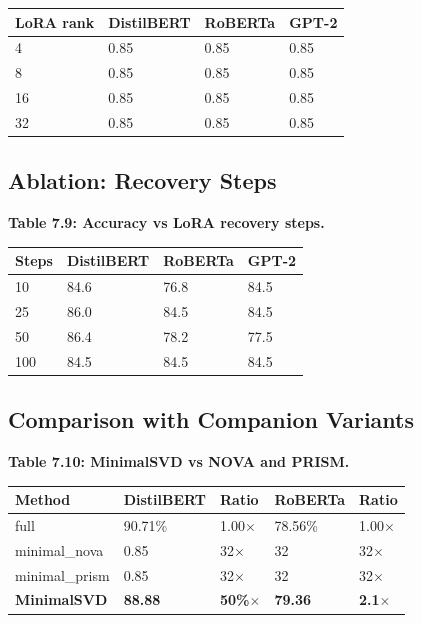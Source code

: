 \begin{table}[H]
\centering
\small
\begin{tabular}{llll}
\toprule
\textbf{LoRA rank} & \textbf{DistilBERT} & \textbf{RoBERTa} & \textbf{GPT-2} \\
\midrule
4 & 0.85 & 0.85 & 0.85 \\
8 & 0.85 & 0.85 & 0.85 \\
16 & 0.85 & 0.85 & 0.85 \\
32 & 0.85 & 0.85 & 0.85 \\
\bottomrule
\end{tabular}
\end{table}

\subsection{Ablation: Recovery Steps}

\textbf{Table 7.9: Accuracy vs LoRA recovery steps.}

\begin{table}[H]
\centering
\small
\begin{tabular}{llll}
\toprule
\textbf{Steps} & \textbf{DistilBERT} & \textbf{RoBERTa} & \textbf{GPT-2} \\
\midrule
10 & 84.6 & 76.8 & 84.5 \\
25 & 86.0 & 84.5 & 84.5 \\
50 & 86.4 & 78.2 & 77.5 \\
100 & 84.5 & 84.5 & 84.5 \\
\bottomrule
\end{tabular}
\end{table}

\subsection{Comparison with Companion Variants}

\textbf{Table 7.10: MinimalSVD vs NOVA and PRISM.}

\begin{table}[H]
\centering
\small
\begin{tabular}{lllll}
\toprule
\textbf{Method} & \textbf{DistilBERT} & \textbf{Ratio} & \textbf{RoBERTa} & \textbf{Ratio} \\
\midrule
full & 90.71\% & 1.00$\times$ & 78.56\% & 1.00$\times$ \\
minimal\_nova & 0.85 & 32$\times$ & 32 & 32$\times$ \\
minimal\_prism & 0.85 & 32$\times$ & 32 & 32$\times$ \\
\textbf{MinimalSVD} & \textbf{88.88} & \textbf{50\%$\times$} & \textbf{79.36} & \textbf{2.1$\times$} \\
\bottomrule
\end{tabular}
\end{table}

